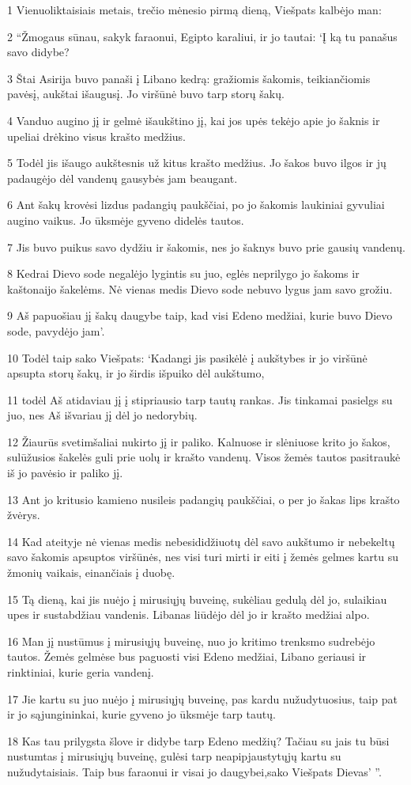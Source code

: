 \par 1 Vienuoliktaisiais metais, trečio mėnesio pirmą dieną, Viešpats kalbėjo man: 
\par 2 “Žmogaus sūnau, sakyk faraonui, Egipto karaliui, ir jo tautai: ‘Į ką tu panašus savo didybe? 
\par 3 Štai Asirija buvo panaši į Libano kedrą: gražiomis šakomis, teikiančiomis pavėsį, aukštai išaugusį. Jo viršūnė buvo tarp storų šakų. 
\par 4 Vanduo augino jį ir gelmė išaukštino jį, kai jos upės tekėjo apie jo šaknis ir upeliai drėkino visus krašto medžius. 
\par 5 Todėl jis išaugo aukštesnis už kitus krašto medžius. Jo šakos buvo ilgos ir jų padaugėjo dėl vandenų gausybės jam beaugant. 
\par 6 Ant šakų krovėsi lizdus padangių paukščiai, po jo šakomis laukiniai gyvuliai augino vaikus. Jo ūksmėje gyveno didelės tautos. 
\par 7 Jis buvo puikus savo dydžiu ir šakomis, nes jo šaknys buvo prie gausių vandenų. 
\par 8 Kedrai Dievo sode negalėjo lygintis su juo, eglės neprilygo jo šakoms ir kaštonai­jo šakelėms. Nė vienas medis Dievo sode nebuvo lygus jam savo grožiu. 
\par 9 Aš papuošiau jį šakų daugybe taip, kad visi Edeno medžiai, kurie buvo Dievo sode, pavydėjo jam’. 
\par 10 Todėl taip sako Viešpats: ‘Kadangi jis pasikėlė į aukštybes ir jo viršūnė apsupta storų šakų, ir jo širdis išpuiko dėl aukštumo, 
\par 11 todėl Aš atidaviau jį į stipriausio tarp tautų rankas. Jis tinkamai pasielgs su juo, nes Aš išvariau jį dėl jo nedorybių. 
\par 12 Žiaurūs svetimšaliai nukirto jį ir paliko. Kalnuose ir slėniuose krito jo šakos, sulūžusios šakelės guli prie uolų ir krašto vandenų. Visos žemės tautos pasitraukė iš jo pavėsio ir paliko jį. 
\par 13 Ant jo kritusio kamieno nusileis padangių paukščiai, o per jo šakas lips krašto žvėrys. 
\par 14 Kad ateityje nė vienas medis nebesididžiuotų dėl savo aukštumo ir nebekeltų savo šakomis apsuptos viršūnės, nes visi turi mirti ir eiti į žemės gelmes kartu su žmonių vaikais, einančiais į duobę. 
\par 15 Tą dieną, kai jis nuėjo į mirusiųjų buveinę, sukėliau gedulą dėl jo, sulaikiau upes ir sustabdžiau vandenis. Libanas liūdėjo dėl jo ir krašto medžiai alpo. 
\par 16 Man jį nustūmus į mirusiųjų buveinę, nuo jo kritimo trenksmo sudrebėjo tautos. Žemės gelmėse bus paguosti visi Edeno medžiai, Libano geriausi ir rinktiniai, kurie geria vandenį. 
\par 17 Jie kartu su juo nuėjo į mirusiųjų buveinę, pas kardu nužudytuosius, taip pat ir jo sąjungininkai, kurie gyveno jo ūksmėje tarp tautų. 
\par 18 Kas tau prilygsta šlove ir didybe tarp Edeno medžių? Tačiau su jais tu būsi nustumtas į mirusiųjų buveinę, gulėsi tarp neapipjaustytųjų kartu su nužudytaisiais. Taip bus faraonui ir visai jo daugybei,­sako Viešpats Dievas’ ”.



